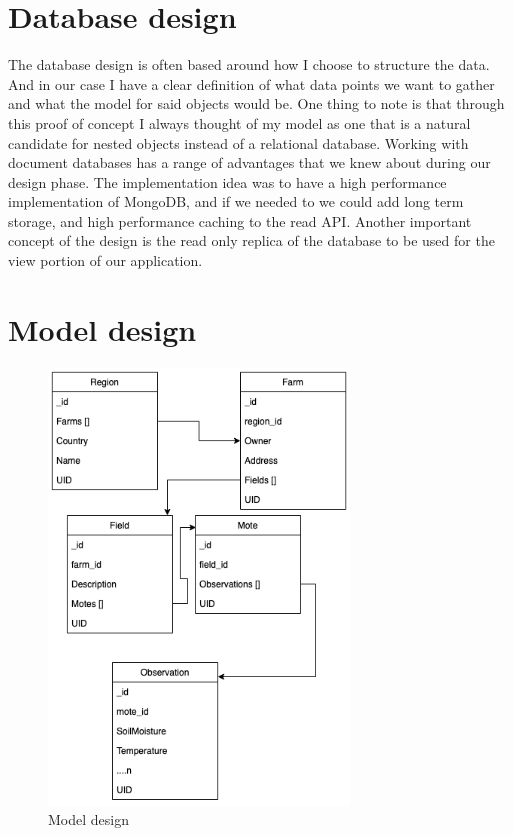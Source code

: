 \documentclass[]{uiophd}
\begin{document}
\section{Database design}
The database design is often based around how I choose to structure the data. And in our case I have a clear definition of what data points we want to gather and what the model for said objects would be. One thing to note is that through this proof of concept I always thought of my model as one that is a natural candidate for nested objects instead of a relational database. Working with document databases has a range of advantages that we knew about during our design phase. The implementation idea was to have a high performance implementation of MongoDB, and if we needed to we could add long term storage, and high performance caching to the read API. Another important concept of the design is the read only replica of the database to be used for the view portion of our application.
\section{Model design}
\begin{figure}[h]
\caption{Model design}
\centering
\includegraphics[width=8cm]{model_golden.png}
\end{figure}
\end{document}
